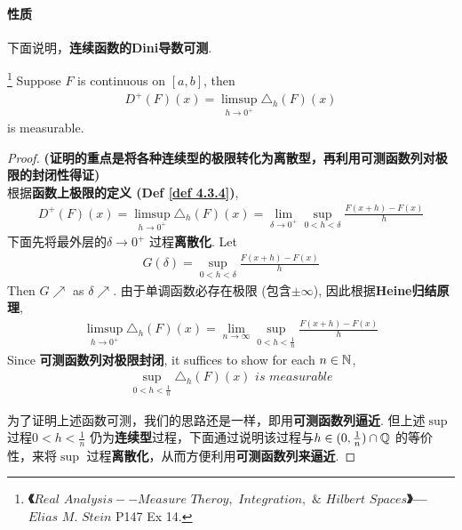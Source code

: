 \paragraph{性质}
	下面说明，\textbf{连续函数的Dini导数可测}.
	\begin{lemma}\label{lemma 4.5.3}\footnote{\textbf{《$Real \,\, Analysis -- Measure \,\, Theroy, \,\, Integration, \,\, \& \,\, Hilbert \,\, Spaces$》--- $Elias \,\, M. \,\, Stein$} P147 Ex 14.}
		Suppose $F$ is continuous on $[a , b]$, then
		\begin{align}
			D^{+}(F)(x) = \limsup_{h \to 0^{+}}{\triangle_{h}(F)(x)}
		\end{align}
		is measurable.
		
		\vspace{4em}
		\begin{proof}
			\textbf{(证明的重点是将各种连续型的极限转化为离散型，再利用可测函数列对极限的封闭性得证)} \\
			根据\textbf{函数上极限的定义 (Def \ref{def 4.3.4})},
			\begin{align}
				D^{+}(F)(x) = \limsup_{h \to 0^{+}}{\triangle_{h}(F)(x)}
				= \lim_{\delta \to 0^{+}}{\sup_{0 < h < \delta}{\frac{F(x + h) - F(x)}{h}}}
			\end{align}
			下面先将最外层的$\delta \to 0^{+}$ 过程\textbf{离散化}. Let
			\begin{align}
				G(\delta) = \sup_{0 < h < \delta}{\frac{F(x + h) - F(x)}{h}}
			\end{align}
			Then $G \nearrow$ as $\delta \nearrow$. 由于单调函数必存在极限 (包含$\pm \infty$), 因此根据\textbf{Heine归结原理},
			\begin{align}
				\limsup_{h \to 0^{+}}{\triangle_{h}(F)(x)}
				= \lim_{n \to \infty}{\sup_{0 < h < \frac{1}{n}}{\frac{F(x + h) - F(x)}{h}}}
			\end{align}
			Since \textbf{可测函数列对极限封闭}, it suffices to show for each $n \in \mathbb{N}$,
			\begin{align}
				\sup_{0 < h < \frac{1}{n}}{\triangle_{h}(F)(x)} \,\, is \,\, measurable
			\end{align}
		
			\vspace{1em}
			
			为了证明上述函数可测，我们的思路还是一样，即用\textbf{可测函数列逼近}. 但上述$\sup$ 过程$0 < h < \frac{1}{n}$ 仍为\textbf{连续型}过程，下面通过说明该过程与$h \in (0 , \frac{1}{n}) \cap \mathbb{Q}$ 的等价性，来将$\sup$ 过程\textbf{离散化}，从而方便利用\textbf{可测函数列来逼近}.
			

\end{proof}
\end{lemma}
